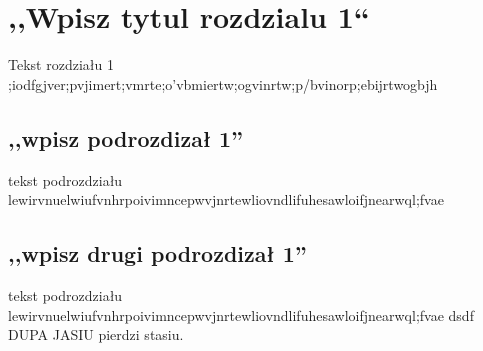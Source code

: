 \chapter{,,Wpisz tytul rozdzialu 1``}\label{chap:rozdzial_1}

Tekst rozdziału 1
;iodfgjver;pvjimert;vmrte;o'vbmiertw;ogvinrtw;p/bvinorp;ebijrtwogbjh

\section{,,wpisz podrozdizał 1''}

tekst podrozdziału lewirvnuelwiufvnhrpoivimncepwvjnrtewliovndlifuhesawloifjnearwql;fvae

\section{,,wpisz drugi podrozdizał 1''}

tekst podrozdziału lewirvnuelwiufvnhrpoivimncepwvjnrtewliovndlifuhesawloifjnearwql;fvae
dsdf DUPA JASIU pierdzi stasiu.